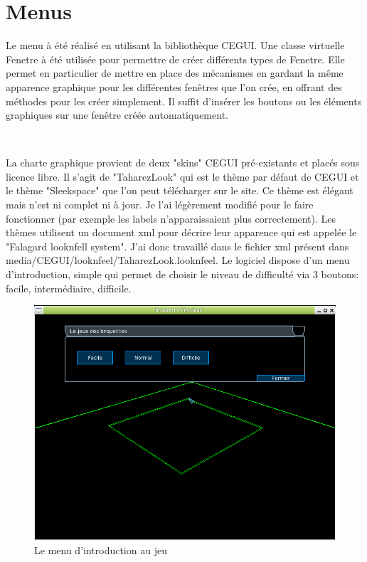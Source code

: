 \documentclass[frenchb,twoside]{EPURapport}
\begin{document}
		
    

    \section{Menus}
        Le menu à été réalisé en utilisant la bibliothèque CEGUI. Une classe
        virtuelle Fenetre à été utilisée pour permettre de créer différents
        types de Fenetre. Elle permet en particulier de mettre en place des
        mécanismes en gardant la même apparence graphique pour les différentes
        fenêtres que l'on crée, en offrant des méthodes pour les créer
        simplement. Il suffit d'insérer les boutons ou les éléments graphiques
        sur une fenêtre créée automatiquement.
        
        \
        
        La charte graphique provient de deux "skins" CEGUI pré-existants et
        placés sous licence libre. Il s'agit de "TaharezLook" qui est le thème
        par défaut de CEGUI et le thème "Sleekspace" que l'on peut télécharger
        sur le site. Ce thème est élégant mais n'est ni complet ni à jour. Je
        l'ai légèrement modifié pour le faire fonctionner (par exemple les
        labels n'apparaissaient plus correctement). Les thèmes utilisent un
        document xml pour décrire leur apparence qui est appelée le "Falagard
        looknfell system". J'ai donc travaillé dans le fichier xml présent
        dans media/CEGUI/looknfeel/TaharezLook.looknfeel.
        Le logiciel dispose d'un menu d'introduction, simple qui permet de
        choisir le niveau de difficulté via 3 boutons: facile, intermédiaire,
        difficile.


		\begin{figure}[h]
			\centering
			\includegraphics[width=16cm]{images/Menus_initial.png}
			\caption{\label{fig:menus_initial}Le menu d'introduction au jeu}
		\end{figure}
		
\end{document}
